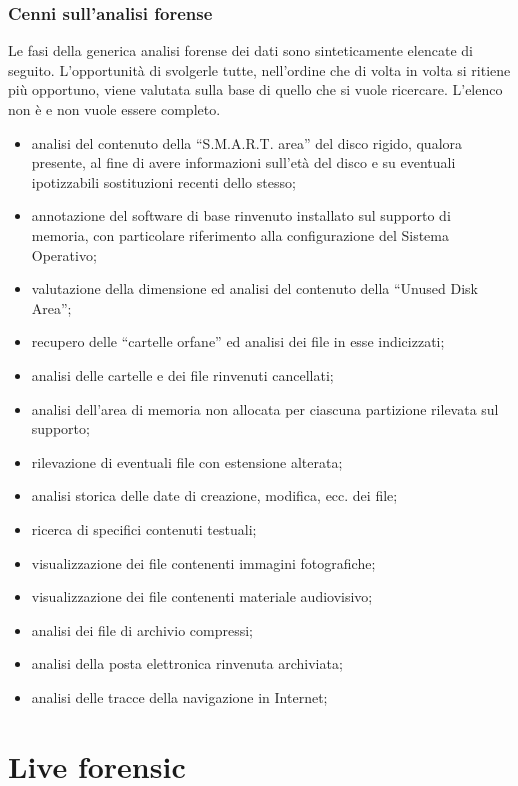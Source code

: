 \documentclass[11pt]{beamer}
\begin{document}
	\begin{frame}[allowframebreaks]
		\frametitle{Cenni sull'analisi forense}
		Le fasi della generica analisi forense dei dati sono sinteticamente elencate di seguito. L'opportunità di svolgerle tutte, nell'ordine che di volta in volta si ritiene più opportuno, viene valutata sulla base di quello che si vuole ricercare. L'elenco non è e non vuole essere completo.
		
		
		\begin{itemize}
			\item analisi del contenuto della ``S.M.A.R.T. area''  del disco rigido, qualora presente, al fine di avere informazioni sull'età del disco e su eventuali ipotizzabili sostituzioni recenti dello stesso;
			\item annotazione del software di base rinvenuto installato sul supporto di memoria, con particolare riferimento alla configurazione del Sistema Operativo;
			\item valutazione della dimensione ed analisi del contenuto della ``Unused Disk Area'';
			\item recupero delle ``cartelle orfane'' ed analisi dei file in esse indicizzati;
			\item analisi delle cartelle e dei file rinvenuti cancellati;
			\item analisi dell'area di memoria non allocata per ciascuna partizione rilevata sul supporto;
			\item rilevazione di eventuali file con estensione alterata;
			\item analisi storica delle date di creazione, modifica, ecc. dei file;
			\item ricerca di specifici contenuti testuali;
			\item visualizzazione dei file contenenti immagini fotografiche;
			\item visualizzazione dei file contenenti materiale audiovisivo;
			\item analisi dei file di archivio compressi;
			\item analisi della posta elettronica rinvenuta archiviata;
			\item analisi delle tracce della navigazione in Internet;
			
		\end{itemize}
	\end{frame}
	
	\section{Live forensic}
	
\end{document}
